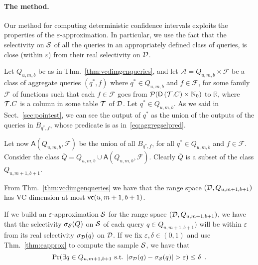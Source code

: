 
\paragraph{The method.} Our method for computing deterministic confidence
intervals exploits the properties of the $\varepsilon$-approximation. 
In particular, we use the fact that the selectivity on ${\cal S}$ of all the queries in an
appropriately defined class of queries, is close (within $\varepsilon$) from
their real selectivity on ${\cal D}$.

Let $Q_{u,m,b}$ be as in Thm.~\ref{thm:vcdimgenqueries}, and let
$\mathcal{A}=Q_{u,m,b}\times\mathcal{F}$  be a class of aggregate queries $(q^*,f)$
where $q^*\in Q_{u,m,b}$ and $f\in\mathcal{F}$, for some family $\mathcal{F}$ of
functions such that each $f\in\mathcal{F}$ goes from
$\mathcal{P}(\mathsf{D}\left({\cal T}.C\right)\times\mathbb{N}_0)$ to $\mathbb{R}$, where ${\cal T}.C$
is a column in some table ${\cal T}$ of ${\cal D}$. Let $q^*\in Q_{u,m,b}$. As we said in
Sect.~\ref{sec:pointest}, we can see the output of $q^*$ as the union of the
outputs of the queries in $B_{q^*,f}$, whose predicate is as
in~\eqref{eq:aggregselpred}. 

Let now $\mathsf{A}(Q_{u,m,b},\mathcal{F})$ be the union of all $B_{q^*,f}$, for
all $q^*\in Q_{u,m,b}$ and $f\in\mathcal{F}$. Consider the class
$\bar{Q}=Q_{u,m,b}\cup \mathsf{A}(Q_{u,m,b},\mathcal{F})$. Clearly $\bar{Q}$ is
a subset of the class $Q_{u,m+1,b+1}$. 

\begin{fact}
From Thm.~\ref{thm:vcdimgenqueries} we have that the range space
$({\cal D},Q_{u,m+1,b+1})$ has VC-dimension at most $\mathsf{vc}(u,m+1,b+1)$. 
\end{fact}

If we build an $\varepsilon$-approximation ${\cal S}$ for
the range space $({\cal D},Q_{u,m+1,b+1})$, we have that the selectivity
$\sigma_{\cal S}(Q)$ on ${\cal S}$ of each query $q\in Q_{u,m+1,b+1})$  will be
within $\varepsilon$ from its real selectivity $\sigma_{\cal D}(q)$ on ${\cal D}$.
If we fix $\varepsilon,\delta\in(0,1)$ and use Thm.~\ref{thm:eapprox} to
compute the sample ${\cal S}$, we have that 
\[
\Pr(\exists q\in Q_{u,m+1,b+1} \text{ s.t. }
|\selectivity_\Db(q)-\selectivity_\Sam(q)|>\varepsilon)\le\delta\enspace.
\]

